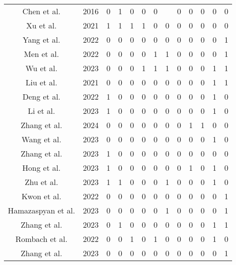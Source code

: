 \begin{table}[t]
{\begin{tabular}{ccccccccccccc}
                Chen et al.\citep{43chen2016fast} & 2016 & 0 & 1 & 0 & 0 & 0 &  & 0 & 0 & 0 & 0 & 0 \\
                Xu et al.\citep{44xu2021drb} & 2021 & 1 & 1 & 1 & 1 & 0 & 0 & 0 & 0 & 0 & 0 & 0 \\
                Yang et al.\citep{45yang2022pastiche} & 2022 & 0 & 0 & 0 & 0 & 0 & 0 & 0 & 0 & 0 & 0 & 1 \\
                Men et al.\citep{46Men_2022_CVPR} & 2022 & 0 & 0 & 0 & 0 & 1 & 1 & 0 & 0 & 0 & 0 & 1 \\
                Wu et al.\citep{47wu2023preserving} & 2023 & 0 & 0 & 0 & 1 & 1 & 1 & 0 & 0 & 0 & 1 & 1 \\
                Liu et al.\citep{48liu2021adaattn} & 2021 & 0 & 0 & 0 & 0 & 0 & 0 & 0 & 0 & 0 & 1 & 1 \\
                Deng et al.\citep{49deng2022stytr2} & 2022 & 1 & 0 & 0 & 0 & 0 & 0 & 0 & 0 & 0 & 1 & 0 \\
                Li et al.\citep{50li2023compact} & 2023 & 1 & 0 & 0 & 0 & 0 & 0 & 0 & 0 & 0 & 1 & 0 \\
                Zhang et al.\citep{51zhang2024rethink} & 2024 & 0 & 0 & 0 & 0 & 0 & 0 & 0 & 1 & 1 & 0 & 0 \\
                Wang et al.\citep{52wang2023interactive} & 2023 & 0 & 0 & 0 & 0 & 0 & 0 & 0 & 0 & 0 & 1 & 0 \\
                Zhang et al.\citep{53zhang2023edge} & 2023 & 1 & 0 & 0 & 0 & 0 & 0 & 0 & 0 & 0 & 0 & 0 \\
                Hong et al.\citep{54hong2023aespa} & 2023 & 1 & 0 & 0 & 0 & 0 & 0 & 0 & 1 & 0 & 1 & 0 \\
                Zhu et al.\citep{55zhu2023all} & 2023 & 1 & 1 & 0 & 0 & 0 & 1 & 0 & 0 & 0 & 1 & 0 \\
                Kwon et al.\citep{57kwon2022clipstyler} & 2022 & 0 & 0 & 0 & 0 & 0 & 0 & 0 & 0 & 0 & 0 & 1 \\
                Hamazaspyan et al.\citep{59hamazaspyan2023diffusion} & 2023 & 0 & 0 & 0 & 0 & 0 & 1 & 0 & 0 & 0 & 0 & 1 \\
                Zhang et al.\citep{60zhang2024artbank} & 2023 & 0 & 1 & 0 & 0 & 0 & 0 & 0 & 0 & 0 & 1 & 1 \\
                Rombach et al.\citep{61rombach2022high} & 2022 & 0 & 0 & 1 & 0 & 1 & 0 & 0 & 0 & 0 & 1 & 0 \\
                Zhang et al.\citep{62zhang2023inversion} & 2023 & 0 & 0 & 0 & 0 & 0 & 0 & 0 & 0 & 0 & 0 & 1 \\

\end{tabular}}
\end{table}
